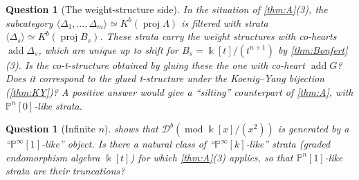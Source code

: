 \documentclass[11pt,reqno]{amsart}
\theoremstyle{plain}
\newtheorem{question}[theorem]{Question}
\theoremstyle{definition}
\theoremstyle{remark}
\newcommand{\kk}{\Bbbk}
\DeclareMathOperator{\add}{add}
\newcommand{\modd}{\operatorname{mod}}
\newcommand{\proj}{\operatorname{proj}}
\newcommand{\Db}{\mathcal{D}^b}
\newcommand{\Kb}{K^b}
\newcommand{\thick}[1]{\langle #1\rangle}
\newcommand{\Pn}[2]{\mathbb{P}^{#1}[#2]}
\begin{document}
\begin{question}[The weight-structure side]
In the situation of \cref{thm:A}(3), the subcategory $\thick{\Delta_1,\dots,\Delta_m}\simeq\Kb(\proj\Lambda)$ is filtered with strata $\thick{\Delta_s}\simeq\Kb(\proj B_s)$. These strata carry the weight structures with co-hearts $\add\Delta_s$, which are unique up to shift for $B_s=\kk[t]/(t^{n+1})$ by \cref{thm:Bonfert}(3). Is the co-t-structure obtained by gluing these \cite{LVY14} the one with co-heart $\add G$? Does it correspond to the glued t-structure under the Koenig--Yang bijection (\cref{thm:KY})? A positive answer would give a ``silting'' counterpart of \cref{thm:A}, with $\Pn n0$-like strata.
\end{question}

\begin{question}[Infinite $n$]
 shows that $\Db(\modd\kk[x]/(x^2))$ is generated by a ``$\Pn\infty1$-like'' object. Is there a natural class of ``$\Pn\infty k$-like'' strata (graded endomorphism algebra $\kk[t]$) for which \cref{thm:A}(3) applies, so that $\Pn n1$-like strata are their truncations?
\end{question}
\end{document}
